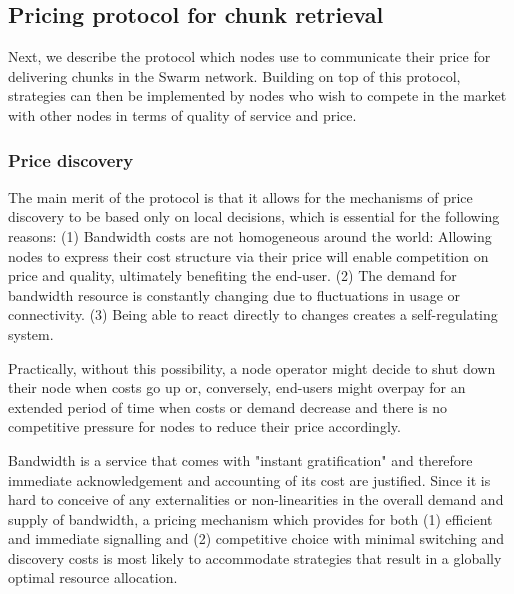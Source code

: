\subsection{Pricing protocol for chunk retrieval\statusgreen}\label{sec:pricing}

\green{}

Next, we describe the protocol which nodes use to communicate their price for delivering chunks in the Swarm network. Building on top of this protocol, strategies can then be implemented by nodes who wish to compete in the market with other nodes in terms of quality of service and price. 

\subsubsection{Price discovery}\label{sec:retrieval-price-discovery}

The main merit of the protocol is that it allows for the mechanisms of price discovery to be based only on local decisions, which is essential for the following reasons: (1) Bandwidth costs are not homogeneous around the world: Allowing nodes to express their cost structure via their price will enable competition on price and quality, ultimately benefiting the end-user. (2) The demand for bandwidth resource is constantly changing due to fluctuations in usage or connectivity. (3) Being able to react directly to changes creates a self-regulating system. 

Practically, without this possibility, a node operator might decide to shut down their node when costs go up or, conversely, end-users might overpay for an extended period of time when costs or demand decrease and there is no competitive pressure for nodes to reduce their price accordingly. 

Bandwidth is a service that comes with "instant gratification" and therefore immediate acknowledgement and accounting of its cost are justified. Since it is hard to conceive of any externalities or non-linearities in the overall demand and supply of bandwidth, a pricing mechanism which provides for both (1) efficient and immediate signalling and (2) competitive choice with minimal switching and discovery costs is most likely to accommodate strategies that result in a globally optimal resource allocation.

